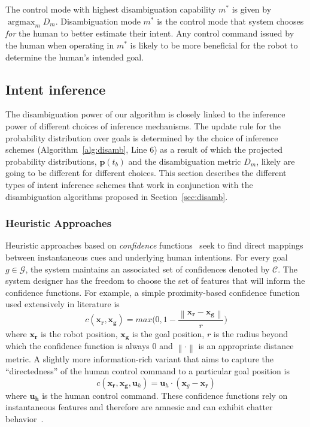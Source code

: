 \documentclass[conference]{IEEEtran}
\DeclareMathOperator*{\argmax}{argmax}
\newcommand{\norm}[1]{\left\lVert#1\right\rVert}
\begin{document}
The control mode with highest disambiguation capability $m^*$ is given by $\argmax_m D_m$. Disambiguation mode $m^*$ is the control mode that system chooses \textit{for} the human to better estimate their intent. Any control command issued by the human when operating in $m^*$ is likely to be more beneficial for the robot to determine the human's intended goal. 

\subsection{Intent inference}\label{ssec:inference}
  The disambiguation power of our algorithm is closely linked to the inference power of different choices of inference mechanisms. The update rule for the probability distribution over goals is determined by the choice of inference schemes (Algorithm~\ref{alg:disamb}, Line 6) as a result of which the projected probability distributions, $\boldsymbol{p}(t_b)$ and the disambiguation metric $D_m$, likely are going to be different for different choices. This section describes the different types of intent inference schemes that work in conjunction with the disambiguation algorithms proposed in Section~\ref{sec:disamb}.

\subsubsection{Heuristic Approaches}
Heuristic approaches based on \textit{confidence} functions~\citep{dragan2013policy} seek to find direct mappings between instantaneous cues and underlying human intentions. For every goal $g \in \mathcal{G}$, the system maintains an associated set of confidences denoted by $\mathcal{C}$. The system designer has the freedom to choose the set of features that will inform the confidence functions. For example, a simple proximity-based confidence function used extensively in literature is
\begin{equation}
c(\boldsymbol{x_r}, \boldsymbol{x_g}) = max\Big(0, 1 - \frac{\norm{\boldsymbol{x_r} - \boldsymbol{x_g}}}{r}\Big)
\end{equation}
where $\boldsymbol{x_r}$ is the robot position, $\boldsymbol{x_g}$ is the goal position, $r$ is the radius beyond which the confidence function is always 0 and $\norm{\cdot}$ is an appropriate distance metric. 
A slightly more information-rich variant that aims to capture the ``directedness'' of the human control command to a particular goal position is
\begin{equation*}
c({\boldsymbol{x_r},\boldsymbol{x_g}, \boldsymbol{u}_{h}}) = \boldsymbol{u}_h\cdot(\boldsymbol{x}_{g} - \boldsymbol{x_r})
\end{equation*}
where $\boldsymbol{u_h}$ is the human control command. These confidence functions rely on instantaneous features and therefore are amnesic and can exhibit chatter behavior~\citep{dragan2012formalizing}.
\end{document}
